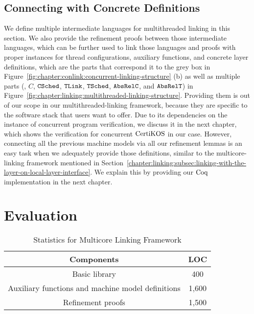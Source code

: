 \subsection{Connecting with Concrete Definitions}
\label{chapter:linking:subsec:connecting-with-thread-local-machine-model}

We define multiple intermediate languages for multithreaded linking in this section.
We  also provide the refinement proofs between those intermediate languages, which can be further used to link those languages and proofs  
with proper instances for thread configurations, auxiliary functions, and
concrete layer definitions,
which are the parts that correspond it to the grey box in Figure~\ref{fig:chapter:conlink:concurrent-linking-structure} (b) as well as 
multiple parts (\ie, $C$, ${{\mathrm{\texttt{CSched}}}}$, ${{\mathrm{\texttt{TLink}}}}$, ${{\mathrm{\texttt{TSched}}}}$, ${{\mathrm{\texttt{AbsRelC}}}}$, and ${{\mathrm{\texttt{AbsRelT}}}}$)
in Figure~\ref{fig:chapter:linking:multithreaded-linking-structure}. 
Providing them is out of our scope in our multithreaded-linking framework,
because they are specific to the software stack that users want to offer. 
Due to its dependencies on the instance of concurrent program verification, 
we discuss it in the next chapter, which shows the verification for concurrent $\mathrm{CertiKOS}$ in our case. 
However, connecting all the previous machine models via
all our refinement lemmas is an
easy task when we adequately provide those definitions, similar to the multicore-linking framework mentioned in Section~\ref{chapter:linking:subsec:linking-with-the-layer-on-local-layer-interface}.
We explain this by providing our $\mathrm{Coq}$ implementation in the next chapter.




\section{Evaluation}

\begin{table}
\begin{center}
\renewcommand{\arraystretch}{1.1}
\setlength{\tabcolsep}{0.3em}
\begin{tabular}{|c|c|}
\hline
Components  & LOC\\
\hline
\hline
Basic library & 400 \\
\hline
Auxiliary functions and machine model definitions & 1,600 \\
\hline
Refinement proofs & 1,500 \\
\hline
\end{tabular}
\end{center}
\caption{Statistics for Multicore Linking Framework}
\label{table:multicore-linking-evaluation}
\hrulefill
\end{table}

